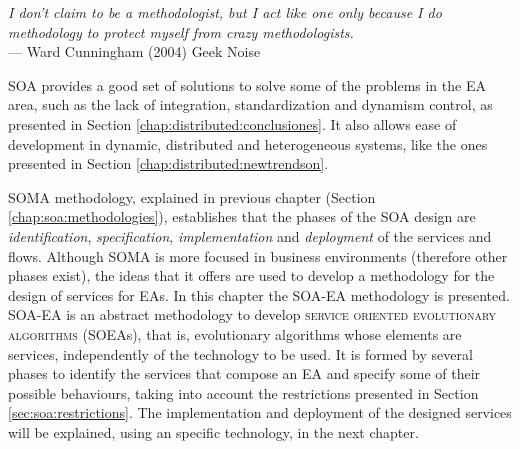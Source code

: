 \label{chap:soaea}


\begin{flushright}{\slshape
    I don't claim to be a methodologist, but I act like one only because
     I do methodology to protect myself from crazy methodologists. } \\ \medskip
    --- {Ward Cunningham (2004) Geek Noise}
\end{flushright}

\minitoc\mtcskip
\vfill
\lettrine{S}{OA} provides a good set of solutions to solve some of the
problems in the EA area, such as the lack of integration,
standardization and dynamism control, as presented in Section \ref{chap:distributed:conclusiones}. It also allows ease of
development in dynamic, distributed and heterogeneous systems, like the ones presented in Section \ref{chap:distributed:newtrendson}. %


SOMA methodology, explained in previous chapter (Section \ref{chap:soa:methodologies}), establishes that the phases of the SOA design are {\em identification}, {\em specification}, {\em implementation} and {\em deployment} of the services and flows. Although SOMA is more focused in business environments (therefore other phases exist), the ideas that it offers are used to develop a methodology for the design of services for EAs. In this chapter the SOA-EA methodology is presented. SOA-EA is an abstract methodology to develop \textsc{service oriented evolutionary algorithms} (SOEAs), that is, evolutionary algorithms whose elements are services, independently of the technology to be used. It is formed by several phases to identify the services that compose an EA and specify some of their possible behaviours, taking into account the restrictions presented in Section \ref{sec:soa:restrictions}. The implementation and deployment of the designed services will be explained, using an specific technology, in the next chapter.

